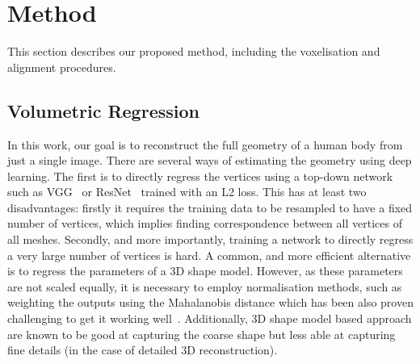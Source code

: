 


\section{Method}

This section describes our proposed method, including the voxelisation
and alignment procedures.

\subsection{Volumetric Regression}

In this work, our goal is to reconstruct the full geometry of a human
body from just a single image.  There are several ways of estimating
the geometry using deep learning. The first is to directly regress the
vertices using a top-down network such as VGG~\cite{simonyan2014vgg}
or ResNet~\cite{he2015deep} trained with an L2 loss. This has at least
two disadvantages: firstly it requires the training data to be
resampled to have a fixed number of vertices, which implies finding
correspondence between all vertices of all meshes. Secondly, and more
importantly, training a network to directly regress a very large
number of vertices is hard. A common, and more efficient alternative
is to regress the parameters of a 3D shape model. However, as these
parameters are not scaled equally, it is necessary to employ
normalisation methods, such as weighting the outputs using the
Mahalanobis distance which has been also proven challenging to get it
working well~\cite{jackson2017vrn}. Additionally, 3D shape model based
approach are known to be good at capturing the coarse shape but less
able at capturing fine details (in the case of detailed 3D
reconstruction).

